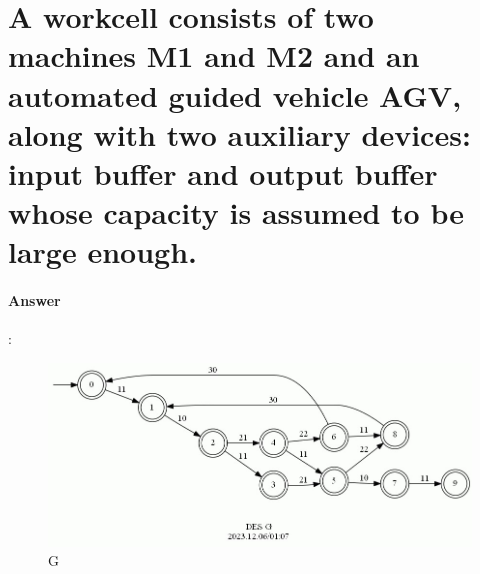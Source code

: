 \documentclass{article}
\begin{document}
  


\section{A workcell consists of two machines M1 and M2 and an automated guided vehicle AGV, along with two auxiliary devices: input buffer and output buffer whose capacity is assumed to be large enough.}

\paragraph{Answer}:

\begin{figure}[h!]
  \centering
  \includegraphics[width=\linewidth]{assets/findg.jpg}
  \caption{G}
  \label{fig:findg}
\end{figure}
\end{document}
